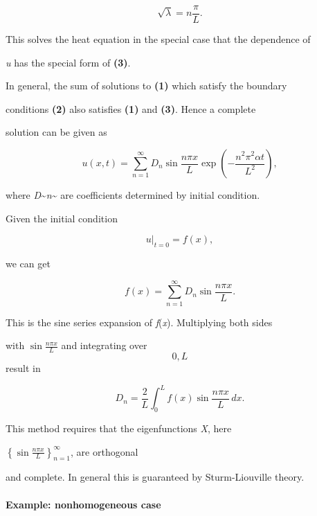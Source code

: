 $$\sqrt{\lambda} = n \frac{\pi}{L}.$$



This solves the heat equation in the special case that the dependence of

\textit{u} has the special form of \textbf{(3)}.



In general, the sum of solutions to \textbf{(1)} which satisfy the boundary

conditions \textbf{(2)} also satisfies \textbf{(1)} and \textbf{(3)}. Hence a complete

solution can be given as



$$u(x,t) = \sum_{n = 1}^{\infty} D_n \sin \frac{n\pi x}{L} \exp\left(-\frac{n^2 \pi^2 \alpha t}{L^2}\right),$$



where \textit{D}\textasciitilde{}\textit{n}\textasciitilde{} are coefficients determined by initial condition.



Given the initial condition



$$u\big|_{t=0}=f(x),$$



we can get



$$f(x) = \sum_{n = 1}^{\infty} D_n \sin \frac{n\pi x}{L}.$$



This is the sine series expansion of \textit{f}(\textit{x}). Multiplying both sides

with $\sin \frac{n\pi x}{L}$ and integrating over \[0, \textit{L}\] result in



$$D_n = \frac{2}{L} \int_0^L f(x) \sin \frac{n\pi x}{L} \, dx.$$



This method requires that the eigenfunctions \textit{X}, here

$\left\{\sin \frac{n\pi x}{L}\right\}_{n=1}^{\infty}$, are orthogonal

and complete. In general this is guaranteed by Sturm-Liouville theory.



\paragraph{Example: nonhomogeneous case}



